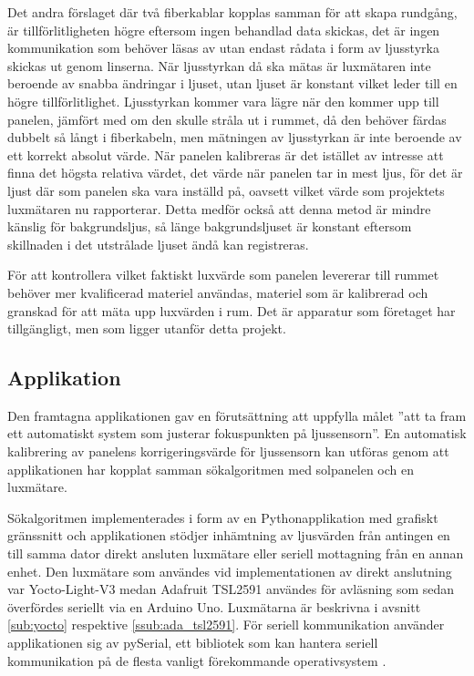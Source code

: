             Det andra förslaget där två fiberkablar kopplas samman för att skapa rundgång, är tillförlitligheten högre eftersom ingen behandlad data skickas, det är ingen kommunikation som behöver läsas av utan endast rådata i form av ljusstyrka skickas ut genom linserna. När ljusstyrkan då ska mätas är luxmätaren inte beroende av snabba ändringar i ljuset, utan ljuset är konstant vilket leder till en högre tillförlitlighet. Ljusstyrkan kommer vara lägre när den kommer upp till panelen, jämfört med om den skulle stråla ut i rummet, då den behöver färdas dubbelt så långt i fiberkabeln, men mätningen av ljusstyrkan är inte beroende av ett korrekt absolut värde. När panelen kalibreras är det istället av intresse att finna det högsta relativa värdet, det värde när panelen tar in mest ljus, för det är ljust där som panelen ska vara inställd på, oavsett vilket värde som projektets luxmätaren nu rapporterar. Detta medför också att denna metod är mindre känslig för bakgrundsljus, så länge bakgrundsljuset är konstant eftersom skillnaden i det utstrålade ljuset ändå kan registreras.\bigskip 

            För att kontrollera vilket faktiskt luxvärde som panelen levererar till rummet behöver mer kvalificerad materiel användas, materiel som är kalibrerad och granskad för att mäta upp luxvärden i rum. Det är apparatur som företaget har tillgängligt, men som ligger utanför detta projekt.

    \subsection{Applikation} %
    \label{sub:applikation}
        Den framtagna applikationen gav en förutsättning att uppfylla målet ''att ta fram ett automatiskt system som justerar fokuspunkten på ljussensorn''. En automatisk kalibrering av panelens korrigeringsvärde för ljussensorn kan utföras genom att applikationen har kopplat samman sökalgoritmen med solpanelen och en luxmätare.\bigskip

        Sökalgoritmen implementerades i form av en Pythonapplikation med grafiskt gränssnitt och applikationen stödjer inhämtning av ljusvärden från antingen en till samma dator direkt ansluten luxmätare eller seriell mottagning från en annan enhet. Den luxmätare som användes vid implementationen av direkt anslutning var Yocto-Light-V3 medan Adafruit TSL2591 användes för avläsning som sedan överfördes seriellt via en Arduino Uno. Luxmätarna är beskrivna i avsnitt \ref{sub:yocto} respektive \ref{ssub:ada_tsl2591}. För seriell kommunikation använder applikationen sig av pySerial, ett bibliotek som kan hantera seriell kommunikation på de flesta vanligt förekommande operativsystem \cite{pyserial}. \bigskip

